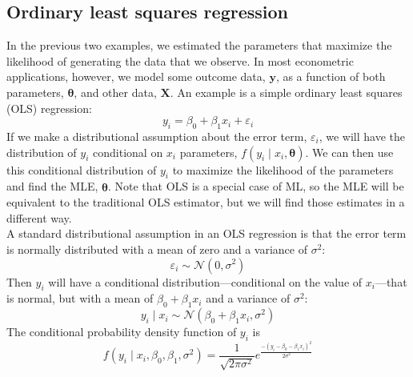 \documentclass[11pt,letterpaper]{article}
\begin{document}
\subsection{Ordinary least squares regression}

In the previous two examples, we estimated the parameters that maximize the likelihood of generating the data that we observe. In most econometric applications, however, we model some outcome data, $\bm{y}$, as a function of both parameters, $\bm{\theta}$, and other data, $\bm{X}$. An example is a simple ordinary least squares (OLS) regression:
$$y_i = \beta_0 + \beta_1 x_i + \varepsilon_i$$
If we make a distributional assumption about the error term, $\varepsilon_i$, we will have the distribution of $y_i$ conditional on $x_i$ parameters, $f(y_i \mid x_i, \bm{\theta})$. We can then use this conditional distribution of $y_i$ to maximize the likelihood of the parameters and find the MLE, $\widehat{\bm{\theta}}$. Note that OLS is a special case of ML, so the MLE will be equivalent to the traditional OLS estimator, but we will find those estimates in a different way. \\

\noindent A standard distributional assumption in an OLS regression is that the error term is normally distributed with a mean of zero and a variance of $\sigma^2$:
$$\varepsilon_i \sim \mathcal{N}(0, \sigma^2)$$
Then $y_i$ will have a conditional distribution---conditional on the value of $x_i$---that is normal, but with a mean of $\beta_0 + \beta_1 x_i$ and a variance of $\sigma^2$:
$$y_i \mid x_i \sim \mathcal{N}(\beta_0 + \beta_1 x_i, \sigma^2)$$
The conditional probability density function of $y_i$ is
$$f(y_i \mid x_i, \beta_0, \beta_1, \sigma^2) = \frac{1}{\sqrt{2 \pi \sigma^2}} e^{\frac{-(y_i - \beta_0 - \beta_1 x_i)^2}{2 \sigma^2}}$$
\end{document}
